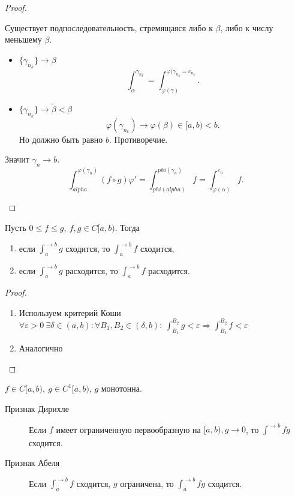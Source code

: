 \begin{prop}
\begin{description}
\begin{proof}
\begin{description}
\begin{enumerate}
			Существует подпоследовательность, стремящаяся либо к $  \beta $, либо к числу меньшему $ \beta $.
			\begin{itemize}
			    \item $ \{ \gamma_{n_k}\} \to \beta $
				    \[
					\int_{\alpha}^{ \gamma_{n_k}} = \int_{ \varphi (\gamma)}^{ \varphi (\gamma_{n_k}=c_{n_k}}
				    .\]
			    \item $ \{\gamma_{n_k}\} \to \tilde\beta < \beta  $
				    \[
					\varphi ( \gamma_{n_k} ) \to  \varphi ( \beta) \in  [ a, b) < b
				    .\]
				    Но должно быть равно $ b$. Противоречие.
			    \end{itemize}
			    Значит $ \gamma_n \to  b $.
			    \[
				\int_{ alpha}^{ \varphi (\gamma_n)} (f \circ g) \varphi ' = \int_{phi(alpha)}^{phi(\gamma_n)} f = \int_{ \varphi ( \alpha )}^{c_n} f
			    .\]
		    \end{enumerate}
	    \end{description}
	\end{proof}
	    \end{description}
    \end{prop}
    \begin{thm}
	Пусть $ 0 \le  f \le g,  ~ f, g \in  C[a, b)$. Тогда
	\begin{enumerate}
	    \item  если $ \int_{a }^{ \to  b} g  $ сходится, то $ \int_{a}^{  \to  b} f $ сходится,
	    \item  если $ \int_{a }^{ \to  b} g  $ расходится, то $ \int_{a}^{  \to  b} f $ расходится.
	\end{enumerate}
    \end{thm}
    \begin{proof}
	$ $
	\begin{enumerate}
	    \item
		Используем критерий Коши $ \forall  \varepsilon >0 ~ \exists  \delta  \in  (a, b): \forall  B_1, B_2 \in  ( \delta  , b): ~ \int_{B_1}^{B_2}g < \varepsilon  \Longrightarrow \int_{B_1}^{B_2} f < \varepsilon     $
	    \item Аналогично
	\end{enumerate}
    \end{proof}
    \begin{thm}
	$ f \in C[a, b), ~ g \in C^{1}[a, b)$, $ g$ монотонна.
	\begin{description}
	    \item[Признак Дирихле] Если $ f$ имеет ограниченную первообразную на  $ [a, b), g \to  0$, то $ \int_{}^{ \to  b}fg  $ сходится.
	    \item[Признак Абеля] Если $  \int_{a}^{ \to  b}  f $ сходится, $ g$  ограничена, то $ \int_{a}^{ \to b} fg   $ сходится.
	\end{description}
    \end{thm}
